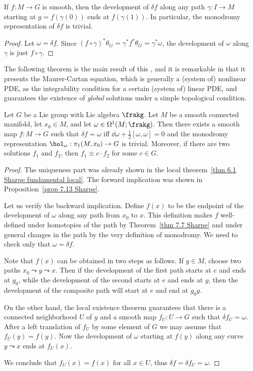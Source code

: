 \begin{prop}\label{prop 7.13 Sharpe}
    If $f:M\to G$ is smooth, then the development of $\delta f$ along any path $\gamma:I\to M$ starting at $g=f(\gamma(0))$ ends at $f(\gamma(1))$. In particular, the monodromy representation of $\delta f$ is trivial.
\end{prop}
\begin{proof}
    Let $\omega=\delta f$. Since $(f\circ \gamma)^\ast \theta_G=\gamma^\ast f^\ast\theta_G=\gamma^\ast\omega$, the development of $\omega$ along $\gamma$ is just $f\circ\gamma$.
\end{proof}

The following theorem is the main result of this \sect, and it is remarkable in that it presents the Maurer-Cartan equation, which is generally a (system of) nonlinear PDE, as the integrability condition for a certain (system of) linear PDE, and guarantees the existence of \emph{global} solutions under a simple topological condition.

\begin{thm}\label{thm 7.14 Sharpe fundamental global}
    Let $G$ be a Lie group with Lie algebra $\frakg$. Let $M$ be a smooth connected manifold, let $x_0\in M$, and let $\omega \in\Omega^1(M;\frakg)$. Then there exists a smooth map $f:M\to G$ such that $\delta f=\omega$ iff $\dd\omega+\frac12[\omega,\omega]=0$ and the monodromy representation $\hol_\omega:\pi_1(M,x_0)\to G$ is trivial. Moreover, if there are two solutions $f_1$ and $f_2$, then $f_1\equiv c\cdot f_2$ for some $c\in G$.
\end{thm}
\begin{proof}
    The uniqueness part was already shown in the local theorem~\ref{thm 6.1 Sharpe fundamental local}. The forward implication  was shown in Proposition~\ref{prop 7.13 Sharpe}.

    Let us verify the backward implication. Define $f(x)$ to be the endpoint of the development of $\omega$ along any path from $x_0$ to $x$. This definition makes $f$ well-defined under homotopies of the path by Theorem~\ref{thm 7.7 Sharpe} and under general changes in the path by the very definition of monodromy. We need to check only that $\omega=\delta f$.

    Note that $f(x)$ can be obtained in two steps as follows. If $y\in M$, choose two paths $x_0\leadsto y\leadsto x$. Then if the development of the first path starts at $e$ and ends at $g_0$, while the development of the second starts at $e$ and ends at $g$, then the development of the composite path will start at $e$ and end at $g_0g$. 
    
    On the other hand, the local existence theorem guarantees that there is a connected neighborhood $U$ of $y$ and a smooth map $f_U:U\to G$ such that $\delta f_U=\omega$. After a left translation of $f_U$ by some element of $G$ we may assume that $f_U(y)=f(y)$. Now the development of $\omega$ starting at $f(y)$ along any curve $y\leadsto x$ ends at $f_U(x)$. 
    
    We conclude that $f_U(x)=f(x)$ for all $x\in U$, thus $\delta f=\delta f_U=\omega$.
\end{proof}

